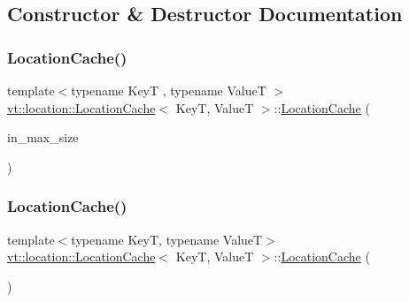 \subsection{Constructor \& Destructor Documentation}
\mbox{\label{structvt_1_1location_1_1_location_cache_a5a43f6d320c5b23dbb819e9bc74deeeb}} 
\subsubsection{\texorpdfstring{Location\+Cache()}{LocationCache()}\hspace{0.1cm}{\footnotesize\ttfamily [1/3]}}
{\footnotesize\ttfamily template$<$typename KeyT , typename ValueT $>$ \\
\hyperlink{structvt_1_1location_1_1_location_cache}{vt\+::location\+::\+Location\+Cache}$<$ KeyT, ValueT $>$\+::\hyperlink{structvt_1_1location_1_1_location_cache}{Location\+Cache} (\begin{DoxyParamCaption}\item[{\hyperlink{namespacevt_1_1location_ab1c4c5849012a23eee2fbd1fce6159d7}{Location\+Size\+Type} const \&}]{in\+\_\+max\+\_\+size }\end{DoxyParamCaption})\hspace{0.3cm}{\ttfamily [explicit]}}

\mbox{\label{structvt_1_1location_1_1_location_cache_a577179b586e3aa1a3d2b3c5dd6a10229}} 
\subsubsection{\texorpdfstring{Location\+Cache()}{LocationCache()}\hspace{0.1cm}{\footnotesize\ttfamily [2/3]}}
{\footnotesize\ttfamily template$<$typename KeyT, typename ValueT$>$ \\
\hyperlink{structvt_1_1location_1_1_location_cache}{vt\+::location\+::\+Location\+Cache}$<$ KeyT, ValueT $>$\+::\hyperlink{structvt_1_1location_1_1_location_cache}{Location\+Cache} (\begin{DoxyParamCaption}\item[{\hyperlink{structvt_1_1location_1_1_location_cache}{Location\+Cache}$<$ KeyT, ValueT $>$ const \&}]{ }\end{DoxyParamCaption})\hspace{0.3cm}{\ttfamily [delete]}}

